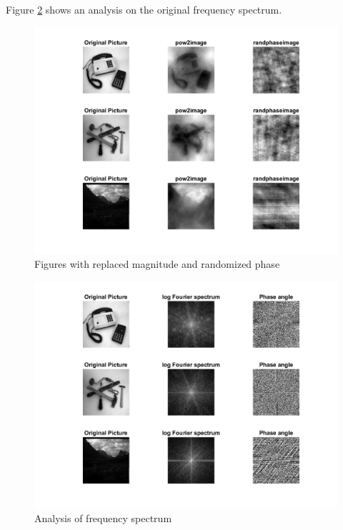 \documentclass{article}
\begin{document}
\begin{enumerate}
Figure \ref{fig1.82} shows an analysis on the original frequency spectrum.

\begin{figure}[H]
        \centering
        \includegraphics[width=15cm]{Lab1_1-8_Q13_fig.png}
        \caption{Figures with replaced magnitude and randomized phase}
        \label{fig1.8}
\end{figure}

\begin{figure}[H]
        \centering
        \includegraphics[width=15cm]{Lab1_1-8.png}
        \caption{Analysis of frequency spectrum}
        \label{fig1.82}
\end{figure}




\end{enumerate}
\end{document}

